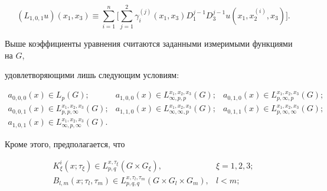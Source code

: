\[

( L_{1, 0, 1}u) ( x_1 ,x_3 ) \equiv

\sum\limits_{i=1}^{n}\biggl[ \sum\limits_{j=1}^{2}\gamma _{i}^{\left(

j\right) }( x_1 ,x_3 ) D_1 ^{j-1}D_3 ^{j-1}u(

x_1 ,x_2 ^{(i) },x_3 ) \biggr].

\]



Выше коэффициенты уравнения считаются заданными измеримыми функциями на $G$,

удовлетворяющими лишь следующим условиям:


$$

\begin{array}{lll}

a_{0, 0, 0}(x)\in L_{p}(G); &

a_{1, 0, 0}(x)\in L_{\infty,p,p}^{x_1 ,x_2 ,x_3 }(G);&

a_{0, 1, 0}(x)\in L_{p,\infty,p}^{x_1 ,x_2 ,x_3 }(G);\\ 

a_{0, 0, 1}(x)\in L_{p,p,\infty}^{x_1 ,x_2 ,x_3 }(G);&

a_{1, 1, 0}(x)\in L_{\infty ,\infty ,p}^{x_1 ,x_2 ,x_3 }(G); &

a_{0, 1, 1}(x)\in L_{p,\infty ,\infty }^{x_1 ,x_2 ,x_3 }(G); \\

a_{1, 0, 1}(x)\in L_{\infty ,p,\infty }^{x_1 ,x_2 ,x_3 }(G).

\end{array}

$$

Кроме этого, предполагается, что

\[

\begin{array}{ll}

K_\xi ^{i} \left(x;\tau _\xi  \right)\in L_{p,q}^{x,\tau _\xi  } \left(G\times G_\xi  \right), & \xi =1, 2, 3;\\

B_{l,m} \left(x;\tau _{l} ,\tau _{m} \right)\in L_{p,q,q}^{x,\tau _{l} ,\tau _{m} } \left(G\times G_{l} \times G_{m} \right),

&  l<m;

\end{array}

\]

